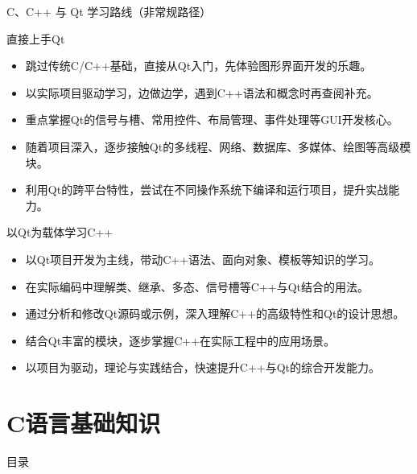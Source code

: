 \documentclass[UTF8,aspectratio=169]{beamer}
\begin{document}
\begin{frame}{C、C++ 与 Qt 学习路线（非常规路径）}
    \begin{ytublock}{直接上手Qt}
        \begin{itemize}
            \item 跳过传统C/C++基础，直接从Qt入门，先体验图形界面开发的乐趣。
            \item 以实际项目驱动学习，边做边学，遇到C++语法和概念时再查阅补充。
            \item 重点掌握Qt的信号与槽、常用控件、布局管理、事件处理等GUI开发核心。
            \item 随着项目深入，逐步接触Qt的多线程、网络、数据库、多媒体、绘图等高级模块。
            \item 利用Qt的跨平台特性，尝试在不同操作系统下编译和运行项目，提升实战能力。
        \end{itemize}
    \end{ytublock}
    \begin{ytublock}{以Qt为载体学习C++}
        \begin{itemize}
            \item 以Qt项目开发为主线，带动C++语法、面向对象、模板等知识的学习。
            \item 在实际编码中理解类、继承、多态、信号槽等C++与Qt结合的用法。
            \item 通过分析和修改Qt源码或示例，深入理解C++的高级特性和Qt的设计思想。
            \item 结合Qt丰富的模块，逐步掌握C++在实际工程中的应用场景。
            \item 以项目为驱动，理论与实践结合，快速提升C++与Qt的综合开发能力。
        \end{itemize}
    \end{ytublock}
\end{frame}


\section{C语言基础知识}
\begin{frame}{目录}
    \begin{multicols}{2}
        \tableofcontents[currentsection]
    \end{multicols}
\end{frame}
\end{document}
